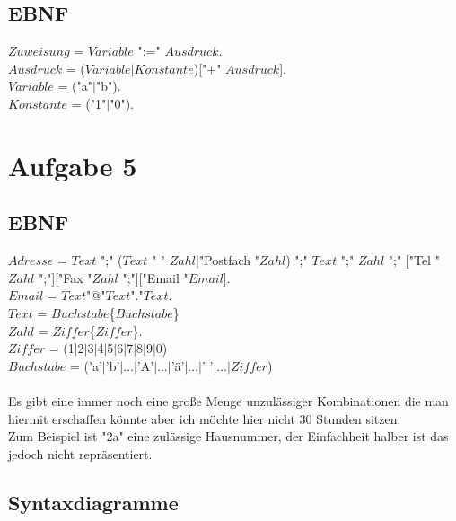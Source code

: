 \documentclass[11pt]{article} %
\begin{document}
\subsection{EBNF}

$Zuweisung$ = $Variable$ ":=" $Ausdruck$.\\
$Ausdruck$ = ($Variable|Konstante$)["+" $Ausdruck$].\\
$Variable$ = ("a"$|$"b").\\
$Konstante$ = ("1"$|$"0").\\

\newpage

\section{Aufgabe 5}

\subsection{EBNF}

$Adresse$ = $Text$ ";" ($Text$ " " $Zahl$|"Postfach "$Zahl$) ";" $Text$ ";" $Zahl$ ";" ["Tel "$Zahl$ ";"]["Fax "$Zahl$ ";"]["Email "$Email$].\\
$Email$ = $Text$"@"$Text$"."$Text$.\\
$Text$ = $Buchstabe$\{$Buchstabe$\}\\
$Zahl$ = $Ziffer$\{$Ziffer$\}.\\
$Ziffer$ = (1$|$2$|$3$|$4$|$5$|$6$|$7$|$8$|$9$|$0)\\
$Buchstabe$ = ('a'$|$'b'$|$...$|$'A'$|$...$|$'ä'$|$...$|$'  '$|$...$|Ziffer$)
\\\\
Es gibt eine immer noch eine große Menge unzulässiger Kombinationen die man hiermit erschaffen könnte aber ich möchte hier nicht 30 Stunden sitzen.\\
Zum Beispiel ist "2a" eine zulässige Hausnummer, der Einfachheit halber ist das jedoch nicht repräsentiert.

\subsection{Syntaxdiagramme}
\end{document}
